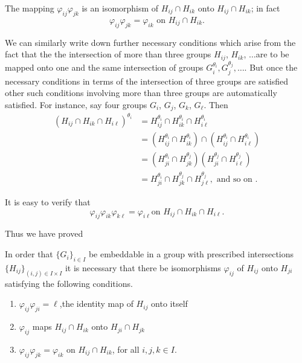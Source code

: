 The mapping $\varphi_{ij} \varphi_{jk}$ is an isomorphism of $H_{ij}
\cap H_{ik}$ onto $H_{ij} \cap H_{ik}$; in fact 
$$
\varphi_{ij} \varphi_{jk} = \varphi_{ik} \text{ on } H_{ij} \cap H_{ik}.
$$

We can similarly write down further necessary conditions which arise
from the fact that the the intersection of more than three groups
$H_{ij}$, $H_{ik}$, $\ldots$\pageoriginale are to be mapped onto one and the same
intersection of groups $G^{\theta_i}_i,  G^{\theta_j}_j, \ldots $. But
once the necessary conditions in terms of the intersection of three
groups are satisfied other such conditions involving more than three
groups are automatically satisfied. For instance, say four groups
$G_i$, $G_j$, $G_k$, $G_{\ell}$. Then  
\begin{align*}
  (H_{ij} \cap H_{ik} \cap H_{i \ell})^{\theta_i} &= H^{\theta_i}_{ij}
  \cap H^{{\theta_i}}_{ik} \cap H^{{\theta_i}}_{i \ell} \\
  &= (H^{\theta_i}_{ij} \cap H^{\theta_i}_{ik}) \cap
  (H^{\theta_i}_{ij} \cap H^{\theta_i}_{i \ell})\\ 
  &=(H^{\theta_i}_{ji} \cap H^{\theta_j}_{jk})  (H^{\theta_j}_{ji}
  \cap H^{\theta_j}_{i \ell})\\ 
  & = H^{\theta_i}_{ji} \cap H^{\theta_j}_{jk} \cap H^{\theta_j}_{j
    \ell}, \text{ and so on }. 
\end{align*}

It is easy to verify that 
$$
\varphi_{ij} \varphi_{ik} \varphi_{k \ell} = \varphi_{i \ell} \text{
  on } H_{ij} \cap H_{ik} \cap H_{ i \ell}. 
$$

Thus we have proved 
\setcounter{theorem}{0}
\begin{theorem}\label{chap9:sec1:thm1}%
  In order that $\big\{ G_i \big\}_{i \in I}$ be embeddable in
  a group with prescribed intersections $\big\{ H_{ij} \big\}_{(i, j)
    \in I \times I}$ it is necessary that there be
  isomorphisms $\varphi_{ij}$ of $H_{ij}$ onto $H_{ji}$ satisfying the
  following conditions. 
\end{theorem}

\begin{enumerate}[(1)]
\item $ \varphi_{ij} \varphi_{ji}= \ell$,\pageoriginale the identity
  map of $H_{ij}$ onto itself  
\item $\varphi_{ij}$ maps $H_{ij} \cap H_{ik}$ onto $H_{ji} \cap H_{jk}$
\item $\varphi_{ij} \varphi_{jk}= \varphi_{ik}$ on $H_{ij} \cap
  H_{ik}$, for all $i,j,k \in I$. 
\end{enumerate}

